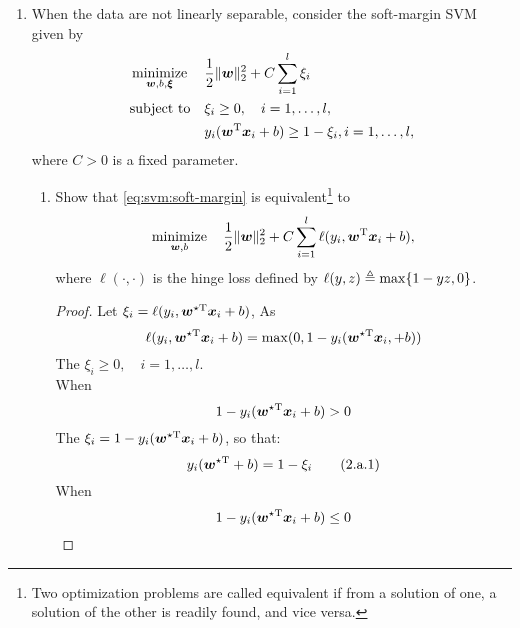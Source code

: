 \documentclass[a4paper]{article}
\begin{document}
{\begin{enumerate}
    \item When the data are not linearly separable, consider the soft-margin SVM given by
        \begin{equation}
        \begin{aligned}
            &\operatorname*{minimize}_{\bm{w},b,\bm{\xi}}& &\frac12 \|\bm{w}\|_2^2 + C\sum_{i=1}^{l}\xi_i \\
            &\mathrm{subject~to}& &\xi_i \geq 0, \quad i = 1,\dots,l, \\
            &&& y_i(\bm{w}^{\mathrm{T}}\bm{x}_i + b) \geq 1 - \xi_i, i = 1,\dots,l,
        \end{aligned}
        \label{eq:svm:soft-margin}
        \end{equation}
        where $C>0$ is a fixed parameter.
        \begin{enumerate}
        \item Show that \eqref{eq:svm:soft-margin} is equivalent\footnote{
                      Two optimization problems are called equivalent if from a solution of one,
                      a solution of the other is readily found, and vice versa.} to
            \begin{equation}
                \operatorname*{minimize}_{\bm{w},b} \quad \frac12 \|\bm{w}\|_2^2 + C\sum_{i=1}^{l} \ell(y_i,\bm{w}^{\mathrm{T}}\bm{x}_i+b),
            \label{eq:svm:hinge}
            \end{equation}
            where $\ell(\cdot,\cdot)$ is the hinge loss defined by $\ell(y,z) \triangleq \max\{1-yz,0\}$.
        \begin{proof}
            \quad Let $\xi_i = \ell(y_i,\bm{w}^{\star\mathrm{T}}\bm{x}_i+b)$, As \begin{equation*}
                \ell(y_i,\bm{w}^{\star\mathrm{T}}\bm{x}_i+b) = \max(0,1-y_i(\bm{w}^{\star\mathrm{T}}\bm{x}_i,+b)) 
                \end{equation*}
                The $\xi_i \geq 0,\quad i = 1,\dots,l$.\\
            When \begin{equation*}
                1 - y_i(\bm{w}^{\star\mathrm{T}}\bm{x}_i + b) > 0
            \end{equation*}
            The $\xi_i = 1 - y_i(\bm{w}^{\star\mathrm{T}}\bm{x}_i+b)$, so that:
            \begin{equation*}
                y_i(\bm{w}^{\star\mathrm{T}}+b) = 1 - \xi_i
            \tag{2.a.1}
            \end{equation*}
            When \begin{equation*}
                1 - y_i(\bm{w}^{\star\mathrm{T}}\bm{x}_i + b) \leq 0
            \end{equation*}

\end{proof}
\end{enumerate}
\end{enumerate}}
\end{document}
